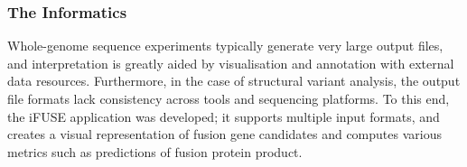 






\subsubsection{The Informatics}
Whole-genome sequence experiments typically generate very large output files, and interpretation is greatly aided by visualisation and annotation with external data resources.  Furthermore, in the case of structural variant analysis, the output file formats lack consistency across tools and sequencing platforms. To this end, the iFUSE application was developed; it supports multiple input formats, and creates a visual representation of fusion gene candidates and computes various metrics such as predictions of fusion protein product.


